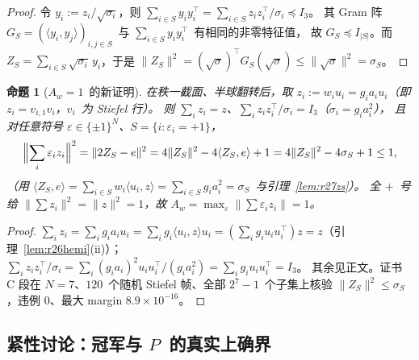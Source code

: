 \documentclass[UTF8,11pt]{ctexart}
\newtheorem{proposition}[theorem]{命题}
\theoremstyle{definition}
\begin{document}
\begin{proof}
令 $y_i:=z_i/\sqrt{\sigma_i}$，则 $\sum_{i\in S}y_iy_i^\top=\sum_{i\in S}z_iz_i^\top/\sigma_i\preceq I_3$。
其 Gram 阵 $G_S=(\langle y_i,y_j\rangle)_{i,j\in S}$~与 $\sum_{i\in S}y_iy_i^\top$~有相同的非零特征值，
故 $G_S\preceq I_{|S|}$。而 $Z_S=\sum_{i\in S}\sqrt{\sigma_i}\,y_i$，于是
$\|Z_S\|^2=(\sqrt{\sigma})^\top G_S(\sqrt{\sigma})\le\|\sqrt\sigma\|^2=\sigma_S$。
\end{proof}

\begin{proposition}[$A_w=1$~的新证明]\label{prop:r27aw}
在秩一截面、半球翻转后，取 $z_i:=w_iu_i=g_ia_iu_i$（即 $z_i=v_{i,1}v_i$，$v_i$~为 Stiefel 行）。
则 $\sum_iz_i=z$、$\sum_iz_iz_i^\top/\sigma_i=I_3$（$\sigma_i=g_ia_i^2$），
且对任意符号 $\varepsilon\in\{\pm1\}^N$、$S=\{i:\varepsilon_i=+1\}$，
\[
\Bigl\|\sum_i\varepsilon_iz_i\Bigr\|^2=\|2Z_S-e\|^2=4\|Z_S\|^2-4\langle Z_S,e\rangle+1
=4\|Z_S\|^2-4\sigma_S+1\le1,
\]
（用 $\langle Z_S,e\rangle=\sum_{i\in S}w_i\langle u_i,z\rangle=\sum_{i\in S}g_ia_i^2=\sigma_S$~与引理~\ref{lem:r27zs}）。
全 $+$~号给 $\|\sum z_i\|^2=\|z\|^2=1$，故 $A_w=\max_\varepsilon\|\sum\varepsilon_iz_i\|=1$。
\end{proposition}

\begin{proof}
$\sum_iz_i=\sum_ig_ia_iu_i=\sum_ig_i\langle u_i,z\rangle u_i=(\sum_ig_iu_iu_i^\top)z=z$（引理~\ref{lem:r26hemi}(ii)）；
$\sum_iz_iz_i^\top/\sigma_i=\sum_i(g_ia_i)^2u_iu_i^\top/(g_ia_i^2)=\sum_ig_iu_iu_i^\top=I_3$。
其余见正文。证书 C 段在 $N=7$、$120$~个随机 Stiefel 帧、全部 $2^7-1$~个子集上核验
$\|Z_S\|^2\le\sigma_S$，违例 $0$、最大 margin $8.9\times10^{-16}$。
\end{proof}

\subsection{紧性讨论：冠军与 $P$~的真实上确界}\label{sec:r27:tight}
\end{document}
